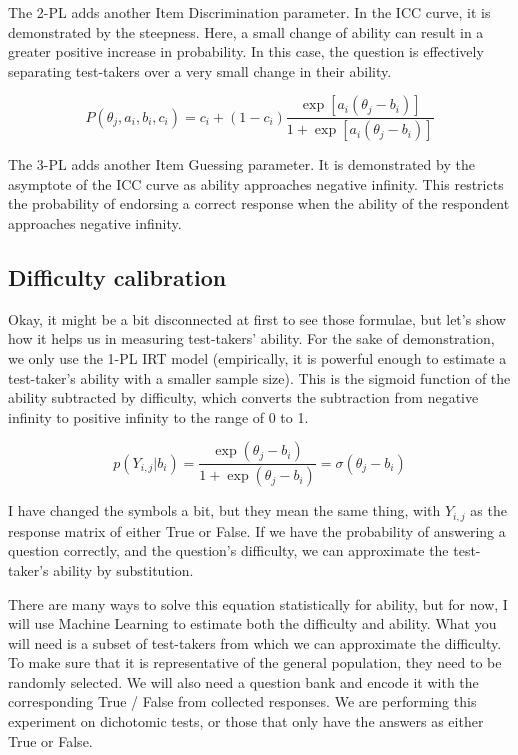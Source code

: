 \documentclass{article}
\begin{document}
The 2-PL adds another Item Discrimination parameter. In the ICC curve, it is demonstrated by the steepness. Here, a small change of ability can result in a greater positive increase in probability. In this case, the question is effectively separating test-takers over a very small change in their ability.

\[
P(\theta_j,a_i,b_i,c_i)=c_i+(1-c_i)\frac{\exp\left[a_i(\theta_j-b_i)\right]}{1+\exp\left[a_i(\theta_j-b_i)\right]}
\]

The 3-PL adds another Item Guessing parameter. It is demonstrated by the asymptote of the ICC curve as ability approaches negative infinity. This restricts the probability of endorsing a correct response when the ability of the respondent approaches negative infinity.

\subsection*{Difficulty calibration}

Okay, it might be a bit disconnected at first to see those formulae, but let’s show how it helps us in measuring test-takers’ ability. For the sake of demonstration, we only use the 1-PL IRT model (empirically, it is powerful enough to estimate a test-taker’s ability with a smaller sample size). This is the sigmoid function of the ability subtracted by difficulty, which converts the subtraction from negative infinity to positive infinity to the range of 0 to 1.

\[
p\left(Y_{i,j}|b_i\right)=\frac{\exp(\theta_j-b_i)}{1+\exp(\theta_j-b_i)}=\sigma(\theta_j-b_i)
\]

I have changed the symbols a bit, but they mean the same thing, with $Y_{i,j}$ as the response matrix of either True or False. If we have the probability of answering a question correctly, and the question’s difficulty, we can approximate the test-taker’s ability by substitution.

There are many ways to solve this equation statistically for ability, but for now, I will use Machine Learning to estimate both the difficulty and ability. What you will need is a subset of test-takers from which we can approximate the difficulty. To make sure that it is representative of the general population, they need to be randomly selected. We will also need a question bank and encode it with the corresponding True / False from collected responses. We are performing this experiment on dichotomic tests, or those that only have the answers as either True or False.
\end{document}
